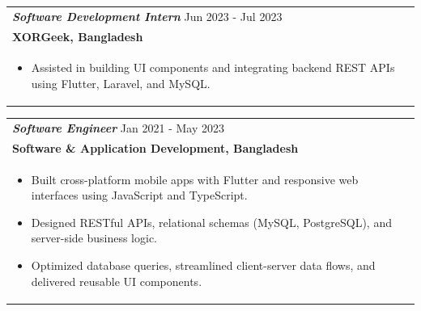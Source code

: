 \documentclass[a4paper,8pt]{article}
\begin{document}
\vspace{3pt}

\begin{tabularx}{\linewidth}{ @{}l r@{} }
\color[HTML]{371e77}\textbf{\textit{Software Development Intern}} \hfill \color[HTML]{371e77} Jun 2023 - Jul 2023 \\[2pt]
\textbf{{XORGeek, Bangladesh}} \hfill \\[2.5pt]
\begin{minipage}[t]{\linewidth}
\begin{itemize}[nosep,after=\strut, leftmargin=1.5em, itemsep=2pt]
\item Assisted in building UI components and integrating backend REST APIs using Flutter, Laravel, and MySQL.
\end{itemize}
\end{minipage}
\end{tabularx}

\vspace{3pt}

\begin{tabularx}{\linewidth}{ @{}l r@{} }
\color[HTML]{371e77}\textbf{\textit{Software Engineer}} \hfill \color[HTML]{371e77} Jan 2021 - May 2023 \\[2pt]
\textbf{{Software \& Application Development, Bangladesh}} \hfill \\[2.5pt]
\begin{minipage}[t]{\linewidth}
\begin{itemize}[nosep,after=\strut, leftmargin=1.5em, itemsep=2pt]
\item Built cross-platform mobile apps with Flutter and responsive web interfaces using JavaScript and TypeScript.
\item Designed RESTful APIs, relational schemas (MySQL, PostgreSQL), and server-side business logic.
\item Optimized database queries, streamlined client-server data flows, and delivered reusable UI components.
\end{itemize}
\end{minipage}
\end{tabularx}

\vfill
\end{document}
